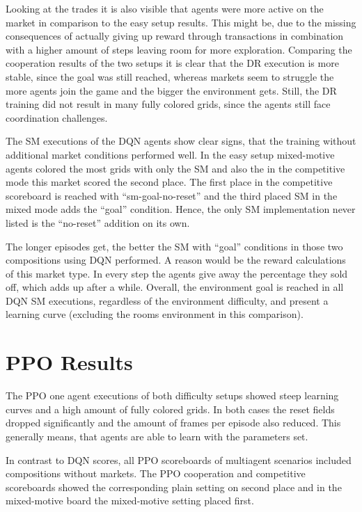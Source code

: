Looking at the trades it is also visible that agents were more active on the market in comparison to the easy setup results. This might be, due to the missing consequences of actually giving up reward through transactions in combination with a higher amount of steps leaving room for more exploration. Comparing the cooperation results of the two setups it is clear that the DR execution is more stable, since the goal was still reached, whereas markets seem to struggle the more agents join the game and the bigger the environment gets. Still, the DR training did not result in many fully colored grids, since the agents still face coordination challenges.

The SM executions of the DQN agents show clear signs, that the training without additional market conditions performed well. In the easy setup mixed-motive agents colored the most grids with only the SM and also the in the competitive mode this market scored the second place. The first place in the competitive scoreboard is reached with ``sm-goal-no-reset'' and the third placed SM in the mixed mode adds the ``goal'' condition. Hence, the only SM implementation never listed is the ``no-reset'' addition on its own.

The longer episodes get, the better the SM with ``goal'' conditions in those two compositions using DQN performed. A reason would be the reward calculations of this market type. In every step the agents give away the percentage they sold off, which adds up after a while. Overall, the environment goal is reached in all DQN SM executions, regardless of the environment difficulty, and present a learning curve (excluding the rooms environment in this comparison).

\section{PPO Results}\label{ppo_results}
The PPO one agent executions of both difficulty setups showed steep learning curves and a high amount of fully colored grids. In both cases the reset fields dropped significantly and the amount of frames per episode also reduced. This generally means, that agents are able to learn with the parameters set.

In contrast to DQN scores, all PPO scoreboards of multiagent scenarios included compositions without markets. The PPO cooperation and competitive scoreboards showed the corresponding plain setting on second place and in the mixed-motive board the mixed-motive setting placed first.

